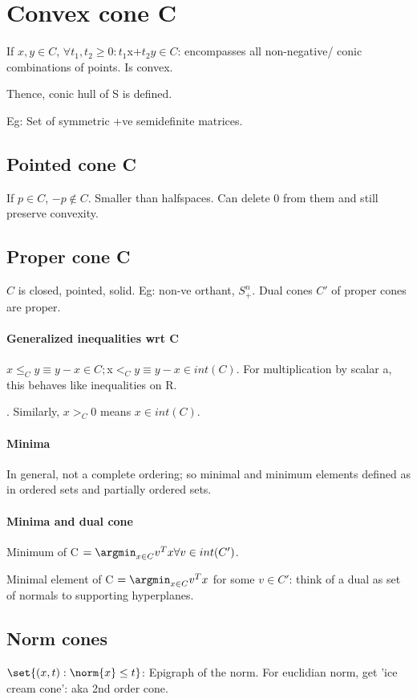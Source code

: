 \documentclass[oneside, article]{memoir}
\begin{document}
\section{Convex cone C}
If $x, y \in C$, $\forall t_1, t_2 \geq 0: t_1 $x$ + t_2 y \in C$: encompasses all non-negative/ conic combinations of points. Is convex.

Thence, conic hull of S is defined.

Eg: Set of symmetric +ve semidefinite matrices.

\subsection{Pointed cone C}
If $p\in C$, $-p \notin C$. Smaller than halfspaces. Can delete 0 from them and still preserve convexity.

\subsection{Proper cone C}
$C$ is closed, pointed, solid. Eg: non-ve orthant, $S^n_+$. Dual cones $C'$ of proper cones are proper.

\paragraph*{Generalized inequalities wrt C}
$x \leq_C y \equiv y-x \in C; $x$ <_C y \equiv y-x \in int(C)$. For multiplication by scalar a, this behaves like inequalities on R.

. Similarly, $x >_C 0$ means $x \in int(C)$.

\paragraph*{Minima}
In general, not a complete ordering; so minimal and minimum elements defined as in ordered sets and partially ordered sets.

\paragraph*{Minima and dual cone}
Minimum of C $ = \argmin_{x \in C} v^{T}x \forall v \in int(C')$.

Minimal element of C $ = \argmin_{x \in C} v^{T}x$ for some $v \in C'$: think of a dual as set of normals to supporting hyperplanes.

\subsection{Norm cones}
$\set{(x, t): \norm{x} \leq t}$: Epigraph of the norm. For euclidian norm, get 'ice cream cone': aka 2nd order cone.
\end{document}
